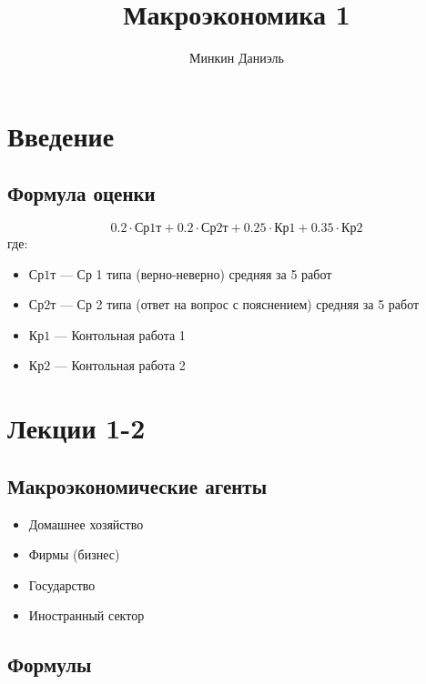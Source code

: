 \documentclass{article}
\title{Макроэкономика 1}
\author{Минкин Даниэль}
\begin{document}
    \maketitle

    \tableofcontents %


    \section{Введение}

    \subsection{Формула оценки}

    \begin{equation}
        0.2 \cdot \text{Ср1т} + 0.2 \cdot \text{Ср2т} + 0.25 \cdot \text{Кр1} + 0.35 \cdot \text{Кр2}
    \end{equation}
    где:
    \begin{itemize}
        \item $\text{Ср1т}$ --- Ср 1 типа (верно-неверно) средняя за 5 работ
        \item $\text{Ср2т}$ --- Ср 2 типа (ответ на вопрос с пояснением) средняя за 5 работ
        \item $\text{Кр1}$ --- Контольная работа 1
        \item $\text{Кр2}$ --- Контольная работа 2
    \end{itemize}


    \section{Лекции 1-2}

    \subsection{Макроэкономические агенты}

    \begin{itemize}
        \item Домашнее хозяйство
        \item Фирмы (бизнес)
        \item Государство
        \item Иностранный сектор
    \end{itemize}

    \subsection{Формулы}
\end{document}
